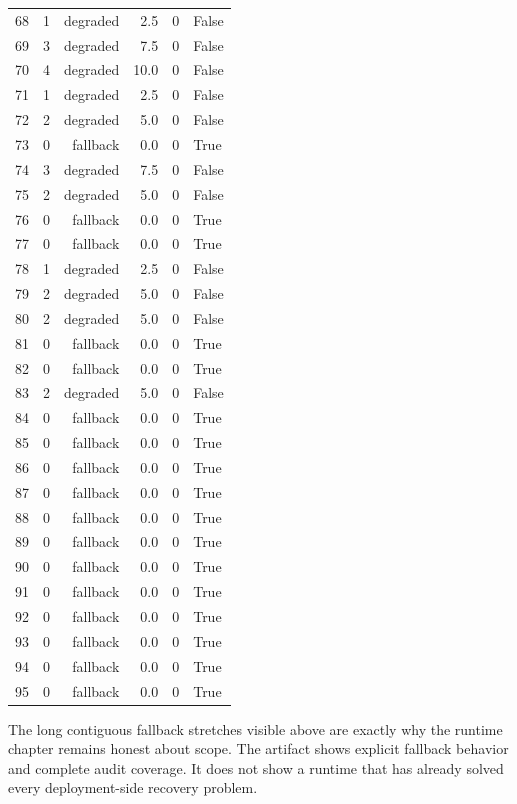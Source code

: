\begin{small}
\begin{longtable}{@{}rrrrrl@{}}
68 & 1 & degraded & 2.5 & 0 & False \\
69 & 3 & degraded & 7.5 & 0 & False \\
70 & 4 & degraded & 10.0 & 0 & False \\
71 & 1 & degraded & 2.5 & 0 & False \\
72 & 2 & degraded & 5.0 & 0 & False \\
73 & 0 & fallback & 0.0 & 0 & True \\
74 & 3 & degraded & 7.5 & 0 & False \\
75 & 2 & degraded & 5.0 & 0 & False \\
76 & 0 & fallback & 0.0 & 0 & True \\
77 & 0 & fallback & 0.0 & 0 & True \\
78 & 1 & degraded & 2.5 & 0 & False \\
79 & 2 & degraded & 5.0 & 0 & False \\
80 & 2 & degraded & 5.0 & 0 & False \\
81 & 0 & fallback & 0.0 & 0 & True \\
82 & 0 & fallback & 0.0 & 0 & True \\
83 & 2 & degraded & 5.0 & 0 & False \\
84 & 0 & fallback & 0.0 & 0 & True \\
85 & 0 & fallback & 0.0 & 0 & True \\
86 & 0 & fallback & 0.0 & 0 & True \\
87 & 0 & fallback & 0.0 & 0 & True \\
88 & 0 & fallback & 0.0 & 0 & True \\
89 & 0 & fallback & 0.0 & 0 & True \\
90 & 0 & fallback & 0.0 & 0 & True \\
91 & 0 & fallback & 0.0 & 0 & True \\
92 & 0 & fallback & 0.0 & 0 & True \\
93 & 0 & fallback & 0.0 & 0 & True \\
94 & 0 & fallback & 0.0 & 0 & True \\
95 & 0 & fallback & 0.0 & 0 & True \\
\end{longtable}
\end{small}

The long contiguous fallback stretches visible above are exactly why the
runtime chapter remains honest about scope.  The artifact shows explicit
fallback behavior and complete audit coverage.  It does not show a runtime
that has already solved every deployment-side recovery problem.
